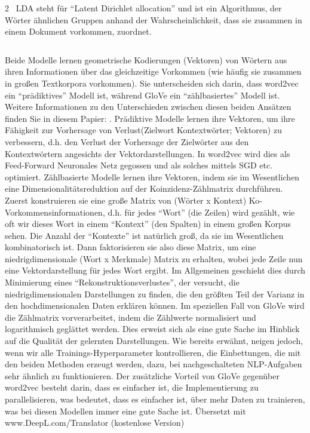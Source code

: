 \documentclass[11pt]{article}
\makeatletter
\newcommand{\boxspacing}{\kern\kvtcb@left@rule\kern\kvtcb@boxsep}
\newcommand{\prompt}[4]{
        \ttfamily\llap{{\color{#2}[#3]:\hspace{3pt}#4}}\vspace{-\baselineskip}
    }
\makeatother
\begin{document}
\hypertarget{fn1}{}
2 ~LDA steht für ``Latent Dirichlet allocation'' und ist ein
Algorithmus, der Wörter ähnlichen Gruppen anhand der Wahrscheinlichkeit,
dass sie zusammen in einem Dokument vorkommen, zuordnet.

    \begin{tcolorbox}[breakable, size=fbox, boxrule=1pt, pad at break*=1mm,colback=cellbackground, colframe=cellborder]
\prompt{In}{incolor}{ }{\boxspacing}
\begin{Verbatim}[commandchars=\\\{\}]

\end{Verbatim}
\end{tcolorbox}

    Beide Modelle lernen geometrische Kodierungen (Vektoren) von Wörtern aus
ihren Informationen über das gleichzeitige Vorkommen (wie häufig sie
zusammen in großen Textkorpora vorkommen). Sie unterscheiden sich darin,
dass word2vec ein ``prädiktives'' Modell ist, während GloVe ein
``zählbasiertes'' Modell ist. Weitere Informationen zu den Unterschieden
zwischen diesen beiden Ansätzen finden Sie in diesem Papier: .
Prädiktive Modelle lernen ihre Vektoren, um ihre Fähigkeit zur
Vorhersage von Verlust(Zielwort \textbar{} Kontextwörter; Vektoren) zu
verbessern, d.h. den Verlust der Vorhersage der Zielwörter aus den
Kontextwörtern angesichts der Vektordarstellungen. In word2vec wird dies
als Feed-Forward Neuronales Netz gegossen und als solches mittels SGD
etc. optimiert. Zählbasierte Modelle lernen ihre Vektoren, indem sie im
Wesentlichen eine Dimensionalitätsreduktion auf der
Koinzidenz-Zählmatrix durchführen. Zuerst konstruieren sie eine große
Matrix von (Wörter x Kontext) Ko-Vorkommensinformationen, d.h. für jedes
``Wort'' (die Zeilen) wird gezählt, wie oft wir dieses Wort in einem
``Kontext'' (den Spalten) in einem großen Korpus sehen. Die Anzahl der
``Kontexte'' ist natürlich groß, da sie im Wesentlichen kombinatorisch
ist. Dann faktorisieren sie also diese Matrix, um eine
niedrigdimensionale (Wort x Merkmale) Matrix zu erhalten, wobei jede
Zeile nun eine Vektordarstellung für jedes Wort ergibt. Im Allgemeinen
geschieht dies durch Minimierung eines ``Rekonstruktionsverlustes'', der
versucht, die niedrigdimensionalen Darstellungen zu finden, die den
größten Teil der Varianz in den hochdimensionalen Daten erklären können.
Im speziellen Fall von GloVe wird die Zählmatrix vorverarbeitet, indem
die Zählwerte normalisiert und logarithmisch geglättet werden. Dies
erweist sich als eine gute Sache im Hinblick auf die Qualität der
gelernten Darstellungen. Wie bereits erwähnt, neigen jedoch, wenn wir
alle Trainings-Hyperparameter kontrollieren, die Einbettungen, die mit
den beiden Methoden erzeugt werden, dazu, bei nachgeschalteten
NLP-Aufgaben sehr ähnlich zu funktionieren. Der zusätzliche Vorteil von
GloVe gegenüber word2vec besteht darin, dass es einfacher ist, die
Implementierung zu parallelisieren, was bedeutet, dass es einfacher ist,
über mehr Daten zu trainieren, was bei diesen Modellen immer eine gute
Sache ist. Übersetzt mit www.DeepL.com/Translator (kostenlose Version)
\end{document}
